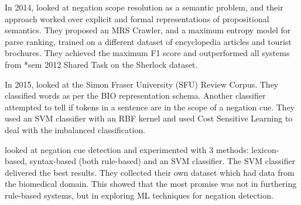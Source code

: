 \documentclass[10pt, a4paper]{article}
\begin{document}
\par In 2014,  looked at negation scope resolution as a semantic problem, and their approach worked over explicit and formal representations of propositional semantics. They proposed an MRS Crawler, and a maximum entropy model for parse ranking, trained on a different dataset of encyclopedia articles and tourist brochures. They achieved the maximum F1 score and outperformed all systems from *sem 2012 Shared Task on the Sherlock dataset. \\
\par In 2015,  looked at the Simon Fraser University (SFU) Review Corpus. They classified words as per the BIO representation schema. Another classifier attempted to tell if tokens in a sentence are in the scope of a negation cue. They used an SVM classifier with an RBF kernel and used Cost Sensitive Learning to deal with the imbalanced classification.
\par {} looked at negation cue detection and experimented with 3 methods: lexicon-based, syntax-based (both rule-based) and an SVM classifier. The SVM classifier delivered the best results. They collected their own dataset which had data from the biomedical domain. This showed that the most promise was not in furthering rule-based systems, but in exploring ML techniques for negation detection.
\end{document}
